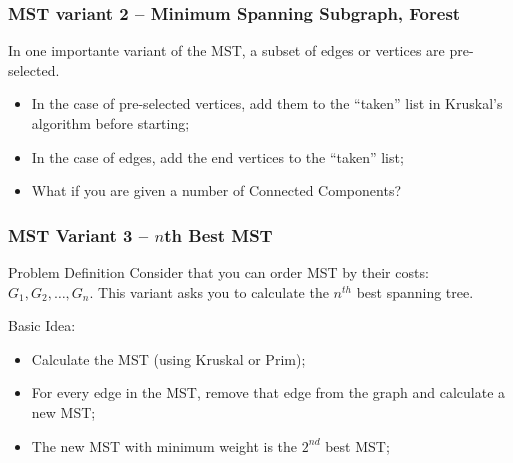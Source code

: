 \begin{frame}
  \frametitle{MST variant 2 -- Minimum Spanning Subgraph, Forest}
  {\smaller
    \begin{block}{}
      In one importante variant of the MST, a subset of edges or
      vertices are pre-selected.

      \begin{itemize}
      \item In the case of pre-selected vertices, add them to the
        ``taken'' list in Kruskal's algorithm before starting;
      \item In the case of edges, add the end vertices to the
        ``taken'' list;
      \item What if you are given a \alert{number of Connected Components}?
      \end{itemize}
    \end{block}
    \begin{center}
    \end{center}
  }
\end{frame}

\begin{frame}
  \frametitle{MST Variant 3 -- $n$th Best MST}
  {\smaller
  \begin{block}{Problem Definition}
    Consider that you can order MST by their costs: $G_1, G_2, \ldots,
    G_n$.  This variant asks you to calculate the $n^{th}$ best
    spanning tree.
  \end{block}

  \bigskip

  Basic Idea:
  \begin{itemize}
    \item Calculate the MST (using Kruskal or Prim);
    \item For every edge in the MST, remove that edge from the graph
      and calculate a new MST;
    \item The new MST with minimum weight is the $2^{nd}$ best MST;
  \end{itemize}
}
\end{frame}

